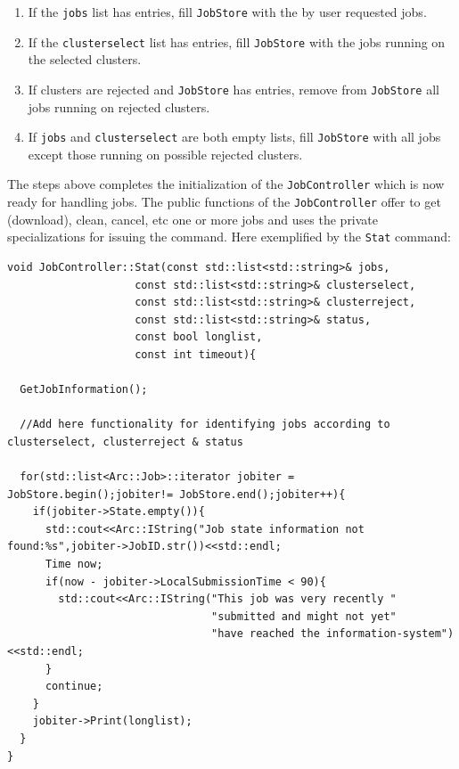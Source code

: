\documentclass{book}
\newcommand{\JobController}{\texttt{JobController}}
\begin{document}
\begin{enumerate}
\item{If the \texttt{jobs} list has entries, fill \texttt{JobStore} with the by user requested jobs.}
\item{If the \texttt{clusterselect} list has entries, fill \texttt{JobStore} with the jobs running on the selected clusters.}
\item{If clusters are rejected and \texttt{JobStore} has entries, remove from \texttt{JobStore} all jobs running on rejected clusters.}
\item{If \texttt{jobs} and \texttt{clusterselect} are both empty lists, fill \texttt{JobStore} with all jobs except those 
running on possible rejected clusters.}
\end{enumerate}

The steps above completes the initialization of the {\JobController} which is now ready for handling jobs. The public functions of the 
{\JobController} offer to get (download), clean, cancel, etc one or more jobs and uses the private specializations for issuing the command. 
Here exemplified by the \texttt{Stat} command:

\begin{shaded}
\begin{small}
\begin{verbatim}
void JobController::Stat(const std::list<std::string>& jobs,
                    const std::list<std::string>& clusterselect,
                    const std::list<std::string>& clusterreject,
                    const std::list<std::string>& status,
                    const bool longlist,
                    const int timeout){
    
  GetJobInformation();

  //Add here functionality for identifying jobs according to clusterselect, clusterreject & status

  for(std::list<Arc::Job>::iterator jobiter = JobStore.begin();jobiter!= JobStore.end();jobiter++){
    if(jobiter->State.empty()){
      std::cout<<Arc::IString("Job state information not found:%s",jobiter->JobID.str())<<std::endl;
      Time now;
      if(now - jobiter->LocalSubmissionTime < 90){
        std::cout<<Arc::IString("This job was very recently "
                                "submitted and might not yet" 
                                "have reached the information-system")<<std::endl;
      }
      continue;
    }
    jobiter->Print(longlist);
  }
}
\end{verbatim}
\end{small}
\end{shaded}
\end{document}
